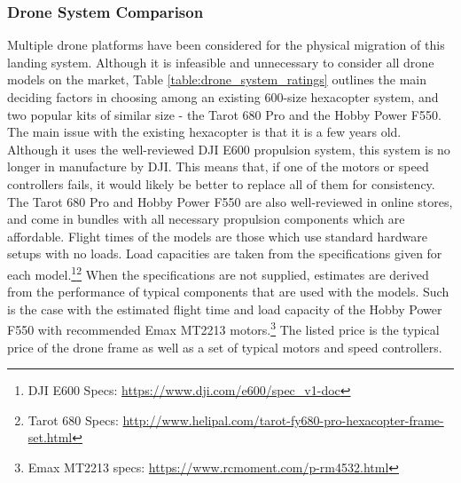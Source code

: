 \subsubsection{Drone System Comparison}

Multiple drone platforms have been considered for the physical migration of this landing system. Although it is infeasible and unnecessary to consider all drone models on the market, Table \ref{table:drone_system_ratings} outlines the main deciding factors in choosing among an existing 600-size hexacopter system, and two popular kits of similar size - the Tarot 680 Pro and the Hobby Power F550. The main issue with the existing hexacopter is that it is a few years old. Although it uses the well-reviewed DJI E600 propulsion system, this system is no longer in manufacture by DJI. This means that, if one of the motors or speed controllers fails, it would likely be better to replace all of them for consistency. The Tarot 680 Pro and Hobby Power F550 are also well-reviewed in online stores, and come in bundles with all necessary propulsion components which are affordable. Flight times of the models are those which use standard hardware setups with no loads. Load capacities are taken from the specifications given for each model.\footnote{DJI E600 Specs: \url{https://www.dji.com/e600/spec_v1-doc}}\footnote{Tarot 680 Specs: \url{http://www.helipal.com/tarot-fy680-pro-hexacopter-frame-set.html}} When the specifications are not supplied, estimates are derived from the performance of typical components that are used with the models. Such is the case with the estimated flight time and load capacity of the Hobby Power F550 with recommended Emax MT2213 motors.\footnote{Emax MT2213 specs: \url{https://www.rcmoment.com/p-rm4532.html}} The listed price is the typical price of the drone frame as well as a set of typical motors and speed controllers.

\begin{table}[ht]
    \centering
    \caption{Drone System Comparison}
    \label{table:drone_system_ratings}
\end{table}

